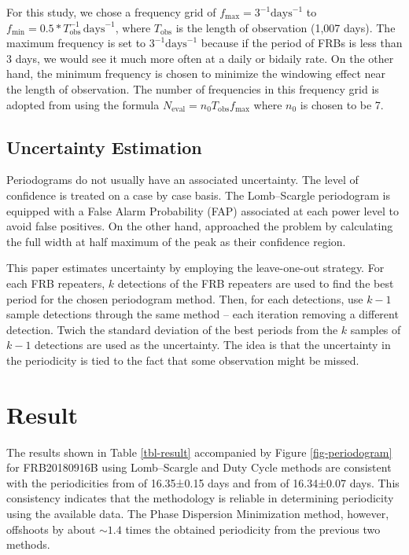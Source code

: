 \documentclass[reprint,amsmath,amssymb,showkeys,prd]{revtex4-2}
\begin{document}
For this study, we chose a frequency grid of $f_\text{max} = 3^{-1} \text{days}^{-1}$ to $f_\text{min} = 0.5 * T_\text{obs}^{-1}\, \text{days}^{-1}$, where $T_\text{obs}$ is the length of observation (1,007 days).
The maximum frequency is set to $3^{-1} \text{days}^{-1}$ because if the period of FRBs is less than 3 days, we would see it much more often at a daily or bidaily rate.
On the other hand, the minimum frequency is chosen to minimize the windowing effect near the length of observation.
The number of frequencies in this frequency grid is adopted from \citet{vanderplas_UnderstandingLombScargle_2018} using the formula $N_\text{eval}=n_0T_\text{obs}f_\text{max}$ where $n_0$ is chosen to be 7.

\subsection{Uncertainty Estimation}
Periodograms do not usually have an associated uncertainty.
The level of confidence is treated on a case by case basis.
The Lomb--Scargle periodogram is equipped with a False Alarm Probability (FAP) associated at each power level to avoid false positives.
On the other hand, \citet{rajwade_PossiblePeriodicActivity_2020} approached the problem by calculating the full width at half maximum of the peak as their confidence region.

This paper estimates uncertainty by employing the leave-one-out strategy.
For each FRB repeaters, $k$ detections of the FRB repeaters are used to find the best period for the chosen periodogram method.
Then, for each detections, use $k-1$ sample detections through the same method -- each iteration removing a different detection.
Twich the standard deviation of the best periods from the $k$ samples of $k-1$ detections are used as the uncertainty.
The idea is that the uncertainty in the periodicity is tied to the fact that some observation might be missed.

\section{Result}

The results shown in Table \ref{tbl-result} accompanied by Figure \ref{fig-periodogram} for FRB20180916B using Lomb--Scargle and Duty Cycle methods are consistent with the periodicities from \citet{thechimefrbcollaborationPeriodicActivityFast2020} of 16.35±0.15 days and from \citet{sand_CHIMEFRBStudy_2023} of 16.34±0.07 days.
This consistency indicates that the methodology is reliable in determining periodicity using the available data.
The Phase Dispersion Minimization method, however, offshoots by about $\sim 1.4$ times the obtained periodicity from the previous two methods.
\end{document}
